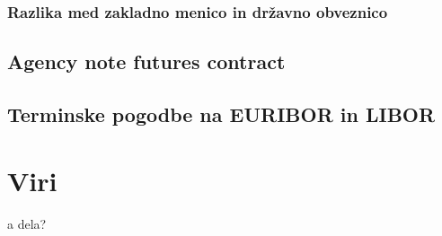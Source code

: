\documentclass[a4paper]{article}
\begin{document}
\subsubsection{Razlika med zakladno menico in državno obveznico}



\subsection{Agency note futures contract}
\subsection{Terminske pogodbe na EURIBOR in LIBOR}

\section{Viri}
\begin{description}
    \item a dela?
\end{description}
\end{document}
